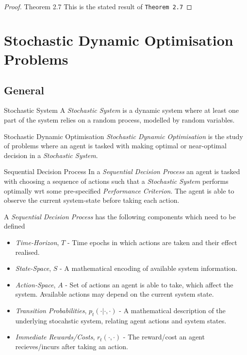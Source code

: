 \documentclass[11pt,a4paper]{article}
\begin{document}
\begin{proof}{Theorem 2.7}
    This is the stated result of \texttt{Theorem 2.7} \proved
  \end{proof}

\section{Stochastic Dynamic Optimisation Problems}

\subsection{General}

  \begin{definition}{Stochastic System}
    A \textit{Stochastic System} is a dynamic system where at least one part of the system relies on a random process, modelled by random variables.
  \end{definition}

  \begin{definition}{Stochastic Dynamic Optimisation}
    \textit{Stochastic Dynamic Optimisation} is the study of problems where an agent is tasked with making optimal or near-optimal decision in a \textit{Stochastic System}.
  \end{definition}

  \begin{definition}{Sequential Decision Process}
    In a \textit{Sequential Decision Process} an agent is tasked with choosing a sequence of actions such that a \textit{Stochastic System} performs optimally wrt some pre-specified \textit{Performance Criterion}. The agent is able to observe the current system-state before taking each action.
    \par A \textit{Sequential Decision Process} has the following components which need to be defined
    \begin{itemize}
      \item \textit{Time-Horizon}, $T$ - Time epochs in which actions are taken and their effect realised.
      \item \textit{State-Space}, $S$ - A mathematical encoding of available system information.
      \item \textit{Action-Space}, $A$ - Set of actions an agent is able to take, which affect the system. Available actions may depend on the current system state.
      \item \textit{Transition Probabilities}, $p_t(\cdot|\cdot,\cdot)$ - A mathematical description of the underlying stocahstic system, relating agent actions and system states.
      \item \textit{Immediate Rewards/Costs}, $r_t(\cdot,\cdot)$ - The reward/cost an agent recieves/incurs after taking an action.
    \end{itemize}
  \end{definition}
\end{document}
